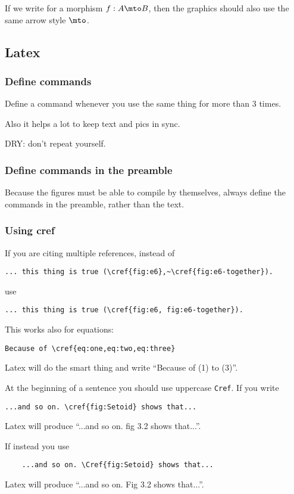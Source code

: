 If we write for a morphism $f: A \mto B$, then the graphics should also use the same arrow style $\mto$.

\subsection*{Latex}

\subsubsection*{Define commands }

Define a command whenever you use the same thing for more than 3 times.

Also it helps a lot to keep text and pics in sync.

DRY: don't repeat yourself.

\subsubsection*{Define commands in the preamble }

Because the figures must be able to compile by themselves, always define the commands in the preamble, rather than the text.

\subsubsection*{Using cref}

If you are citing multiple references, instead of 
% 
\begin{verbatim}
... this thing is true (\cref{fig:e6},~\cref{fig:e6-together}).
\end{verbatim}
% 
use
% 
\begin{verbatim}
... this thing is true (\cref{fig:e6, fig:e6-together}).
\end{verbatim}
% 
This works also for equations:
% 
\begin{verbatim}
Because of \cref{eq:one,eq:two,eq:three}
\end{verbatim}
% 
Latex will do the smart thing and write ``Because of (1) to (3)''.

At the beginning of a sentence you should use uppercase \texttt{Cref}.
If you write 
% 
\begin{verbatim}
...and so on. \cref{fig:Setoid} shows that...
\end{verbatim}
% 
Latex will produce ``...and so on. fig 3.2 shows that...''.

If instead you use 
\begin{verbatim}
    ...and so on. \Cref{fig:Setoid} shows that...
\end{verbatim}
Latex will produce ``...and so on. Fig 3.2 shows that...''.

